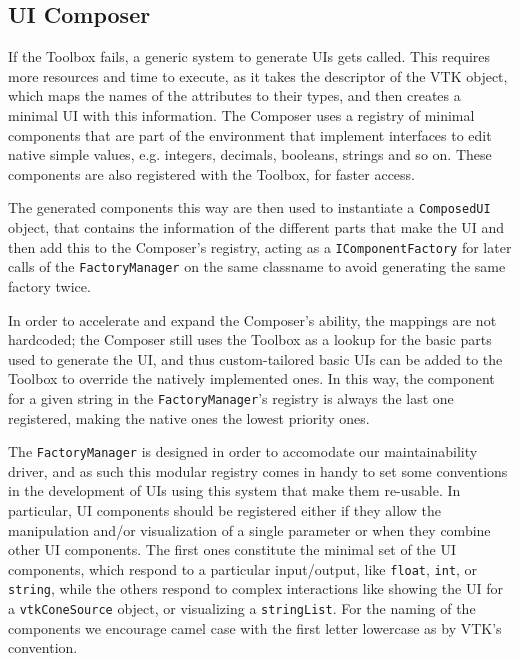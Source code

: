 
\subsection{UI Composer}
\label{sec:design-uicomposer}

If the Toolbox fails, a generic system to generate UIs gets called. This requires more resources and time to execute, as it takes the descriptor of the VTK object, which maps the names of the attributes to their types, and then creates a minimal UI with this information. The Composer uses a registry of minimal components that are part of the environment that implement interfaces to edit native simple values, e.g. integers, decimals, booleans, strings and so on. These components are also registered with the Toolbox, for faster access.

The generated components this way are then used to instantiate a \verb|ComposedUI| object, that contains the information of the different parts that make the UI and then add this to the Composer's registry, acting as a \verb|IComponentFactory| for later calls of the \verb|FactoryManager| on the same classname to avoid generating the same factory twice.

In order to accelerate and expand the Composer's ability, the mappings are not hardcoded; the Composer still uses the Toolbox as a lookup for the basic parts used to generate the UI, and thus custom-tailored basic UIs can be added to the Toolbox to override the natively implemented ones. In this way, the component for a given string in the \verb|FactoryManager|'s registry is always the last one registered, making the native ones the lowest priority ones.

The \verb|FactoryManager| is designed in order to accomodate our maintainability driver, and as such this modular registry comes in handy to set some conventions in the development of UIs using this system that make them re-usable. In particular, UI components should be registered either if they allow the manipulation and/or visualization of a single parameter or when they combine other UI components. The first ones constitute the minimal set of the UI components, which respond to a particular input/output, like \verb|float|, \verb|int|, or \verb|string|, while the others respond to complex interactions like showing the UI for a \verb|vtkConeSource| object, or visualizing a \verb|stringList|. For the naming of the components we encourage camel case with the first letter lowercase as by VTK's convention. 

